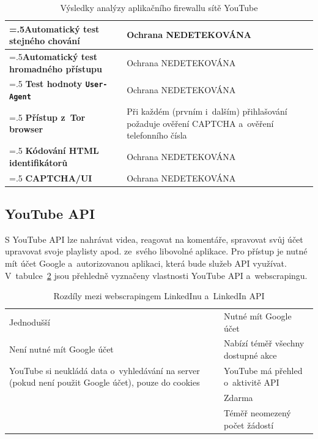 \begin{table}[H]
\begin{tabularx}{\linewidth}{
    |>{\raggedright\arraybackslash\hsize=.5\hsize}X|>{\hsize=1.5\hsize}X|
  }
\hline

\textbf{Automatický test stejného chování} & Ochrana NEDETEKOVÁNA \\
\hline
\textbf{Automatický test hromadného přístupu} & Ochrana NEDETEKOVÁNA \\
\hline
\textbf{Test hodnoty \texttt{User-Agent}} & Ochrana NEDETEKOVÁNA \\
\hline
\textbf{Přístup z~Tor browser} & Při každém (prvním i~dalším) přihlašování požaduje ověření CAPTCHA a~ověření telefonního čísla \\
\hline
\textbf{Kódování HTML identifikátorů} & Ochrana NEDETEKOVÁNA \\
\hline
\textbf{CAPTCHA/UI} & Ochrana NEDETEKOVÁNA \\
\hline
\end{tabularx}

\label{tab:YouTube_analyse}
\caption{Výsledky analýzy aplikačního firewallu sítě YouTube}
\end{table}

\subsection*{YouTube API}
S YouTube API lze nahrávat videa, reagovat na komentáře, spravovat svůj účet upravovat svoje playlisty apod. ze~svého libovolné aplikace. Pro přístup je nutné mít účet Google a~autorizovanou aplikaci, která bude služeb API využívat. V~tabulce~\ref{tab:YouTube_API_vs_webscraping} jsou přehledně vyznačeny vlastnosti YouTube API a~webscrapingu.

\begin{table}[H]
\begin{tabularx}{\linewidth}{
    |>{\hsize=1\hsize}X|>{\hsize=1\hsize}X|
  }
\hline

\multicolumn{1}{|c|}{\textbf{Webscraping}} & \multicolumn{1}{|c|}{\textbf{Twitter API}} \\ \hline
Jednodušší & Nutné mít Google účet \\ \hline
Není nutné mít Google účet & Nabízí téměř všechny dostupné akce \\ \hline
YouTube si neukládá data o~vyhledávání na server (pokud není použit Google účet), pouze do cookies & YouTube má přehled o~aktivitě API \\ \hline
 & Zdarma \\ \hline
 & Téměř neomezený počet žádostí \\ \hline
\end{tabularx}

\label{tab:YouTube_API_vs_webscraping}
\caption{Rozdíly mezi webscrapingem LinkedInu a~LinkedIn API}
\end{table}

